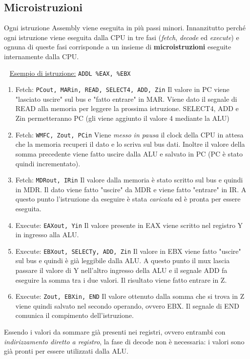 \documentclass[a4paper,11pt,oneside]{book}
\begin{document}
\subsection{Microistruzioni}
Ogni istruzione Assembly viene eseguita in più passi minori. Innanzitutto perché ogni istruzione viene eseguita dalla CPU in tre fasi (\emph{fetch}, \emph{decode}
ed \emph{execute}) e ognuna di queste fasi corrisponde a un insieme di \textbf{microistruzioni} eseguite internamente dalla CPU.

~\newline
\underline{Esempio di istruzione:} \tabto{4cm} \texttt{ADDL \%EAX, \%EBX}
\begin{enumerate}
    \item Fetch: \texttt{PCout, MARin, READ, SELECT4, ADD, Zin} \newline
    Il valore in PC viene "lasciato uscire" sul bus e "fatto entrare" in MAR. Viene dato il segnale di READ alla memoria per leggere la prossima istruzione. SELECT4, ADD e Zin permetteranno PC (gli viene aggiunto il valore 4 mediante la ALU)
    
    \item Fetch: \texttt{WMFC, Zout, PCin} \newline
    Viene \emph{messo in pausa} il clock della CPU in attesa che la memoria recuperi il dato e lo scriva sul bus dati. \newline Inoltre il valore della somma precedente viene fatto uscire dalla ALU e salvato in PC (PC è stato quindi incrementato).
    
    \item Fetch: \texttt{MDRout, IRin} \newline
    Il valore dalla memoria è stato scritto sul bus e quindi in MDR. Il dato viene fatto "uscire" da MDR e viene fatto "entrare" in IR. A questo punto l'istruzione da eseguire è stata \emph{caricata} ed è pronta per essere eseguita.

    \item Execute: \texttt{EAXout, Yin} \newline
    Il valore presente in EAX viene scritto nel registro Y in ingresso alla ALU.

    \item Execute: \texttt{EBXout, SELECTy, ADD, Zin} \newline
    Il valore in EBX viene fatto "uscire" sul bus e quindi è già leggibile dalla ALU. A questo punto il mux lascia passare il valore di Y nell'altro ingresso della ALU e il segnale ADD fa eseguire la somma tra i due valori. Il risultato viene fatto entrare in Z.

    \item Execute: \texttt{Zout, EBXin, END} \newline
    Il valore ottenuto dalla somma che si trova in Z viene quindi salvato nel secondo operando, ovvero EBX. Il segnale di END comunica il compimento dell'istruzione.
\end{enumerate}
Essendo i valori da sommare già presenti nei registri, ovvero entrambi con \emph{indirizzamento diretto a registro}, la fase di decode non è necessaria: i valori sono già pronti per essere utilizzati dalla ALU.
\end{document}

